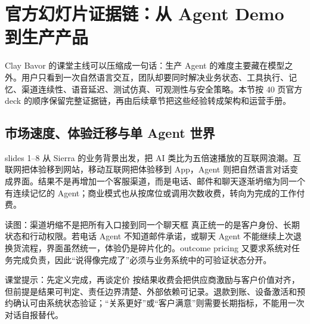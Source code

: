 \section{官方幻灯片证据链：从 Agent Demo 到生产产品}

Clay Bavor 的课堂主线可以压缩成一句话：生产 Agent 的难度主要藏在模型之外。用户只看到一次自然语言交互，团队却要同时解决业务状态、工具执行、记忆、渠道连续性、语音延迟、测试仿真、可观测性与安全策略。本节按 40 页官方 deck 的顺序保留完整证据链，再由后续章节把这些经验转成架构和运营手册。

\subsection{市场速度、体验迁移与单 Agent 世界}

slides 1--8 从 Sierra 的业务背景出发，把 AI 类比为五倍速播放的互联网浪潮。互联网把体验移到网站，移动互联网把体验移到 App，Agent 则把自然语言对话变成界面。结果不是再增加一个客服渠道，而是电话、邮件和聊天逐渐坍缩为同一个有连续记忆的 Agent；商业模式也从按席位或调用次数收费，转向为完成的工作付费。


\begin{knowledgebox}{读图：渠道坍缩不是把所有入口接到同一个聊天框}
真正统一的是客户身份、长期状态和行动权限。若电话 Agent 不知道邮件承诺，或聊天 Agent 不能继续上次退换货流程，界面虽然统一，体验仍是碎片化的。outcome pricing 又要求系统对任务完成负责，因此“说得像完成了”必须与业务系统中的可验证状态分开。
\end{knowledgebox}

\begin{importantbox}{课堂提示：先定义完成，再谈定价}
按结果收费会把供应商激励与客户价值对齐，但前提是结果可判定、责任边界清楚、外部依赖可记录。退款到账、设备激活和预约确认可由系统状态验证；“关系更好”或“客户满意”则需要长期指标，不能用一次对话自报替代。
\end{importantbox}


